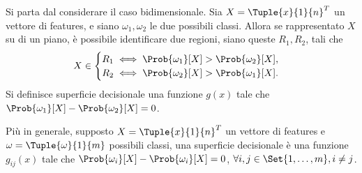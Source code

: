 \documentclass{subfiles}
\begin{document}
Si parta dal considerare il caso bidimensionale.
Sia \(X = \Tuple{x}{1}{n}^{T}\) un vettore di features, e siano \(\omega_{1}, \omega_{2}\) le due possibili classi.
Allora se rappresentato \(X\) su di un piano, è possibile identificare due regioni, siano queste \(R_{1}, R_{2}\), tali che
\[X \in \begin{cases}
        R_{1} \iff \Prob{\omega_{1}}[X] > \Prob{\omega_{2}}[X], \\
        R_{2} \iff \Prob{\omega_{2}}[X] > \Prob{\omega_{1}}[X].
    \end{cases}\]
Si definisce superficie decisionale una funzione \(g(x)\) tale che \(\Prob{\omega_{1}}[X] - \Prob{\omega_{2}}[X] = 0\).

Più in generale, supposto \(X = \Tuple{x}{1}{n}^{T}\) un vettore di features e \(\omega = \Tuple{\omega}{1}{m}\) possibili classi,
una superficie decisionale è una funzione \(g_{ij}(x)\) tale che \(\Prob{\omega_{i}}[X] - \Prob{\omega_{i}}[X] = 0\), \(\forall i, j \in \Set{1, \ldots, m}, i \ne j\).
\end{document}
